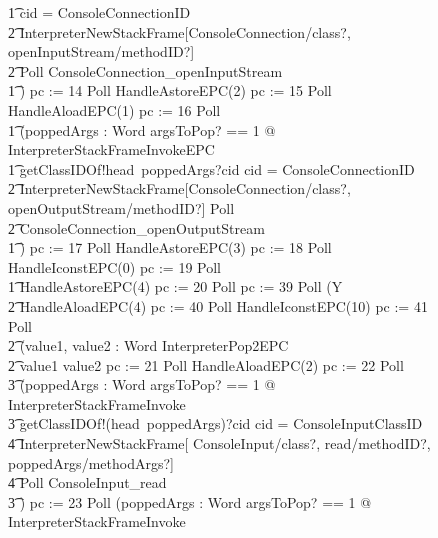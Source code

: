 \begin{figure}[tp!]
{\begin{circus}
    \t1 \circif cid = ConsoleConnectionID \circthen {} \\
    \t2 \lschexpract InterpreterNewStackFrame[ConsoleConnection/class?, openInputStream/methodID?] \rschexpract \circseq \\
    \t2 Poll \circseq ConsoleConnection\_openInputStream \\
    \t1 \circfi) \circseq pc := 14 \circseq Poll \circseq HandleAstoreEPC(2) \circseq pc := 15 \circseq Poll \circseq HandleAloadEPC(1) \circseq pc := 16 \circseq Poll \circseq \\
    \t1 (\circvar poppedArgs : Word \circspot \lschexpract \exists argsToPop? == 1 @ InterpreterStackFrameInvokeEPC \rschexpract \circseq \\
    \t1 getClassIDOf!head~poppedArgs?cid \then \circif cid = ConsoleConnectionID \circthen {} \\
    \t2 \lschexpract InterpreterNewStackFrame[ConsoleConnection/class?, openOutputStream/methodID?] \rschexpract \circseq Poll \circseq \\
    \t2 ConsoleConnection\_openOutputStream \\
    \t1 \circfi) \circseq pc := 17 \circseq Poll \circseq HandleAstoreEPC(3) \circseq pc := 18 \circseq Poll \circseq HandleIconstEPC(0) \circseq pc := 19 \circseq Poll \circseq \\
    \t1 HandleAstoreEPC(4) \circseq pc := 20 \circseq Poll \circseq pc := 39 \circseq Poll \circseq (\circmu Y \circspot \\
    \t2 HandleAloadEPC(4) \circseq pc := 40 \circseq Poll \circseq HandleIconstEPC(10) \circseq  pc := 41 \circseq Poll \circseq \\
    \t2 (\circvar value1, value2 : Word \circspot InterpreterPop2EPC \\
    \t2 \circif value1 \leq value2 \circthen pc := 21 \circseq Poll \circseq HandleAloadEPC(2) \circseq pc := 22 \circseq Poll \circseq \\
    \t3 (\circvar poppedArgs : \seq Word \circspot \lschexpract \exists argsToPop?  == 1 @ InterpreterStackFrameInvoke \rschexpract \circseq \\
    \t3 getClassIDOf!(head~poppedArgs)?cid \then \circif cid = ConsoleInputClassID \circthen {} \\
    \t4 \lschexpract InterpreterNewStackFrame[ ConsoleInput/class?, read/methodID?, poppedArgs/methodArgs?] \rschexpract \circseq \\
    \t4 Poll \circseq ConsoleInput\_read \\
    \t3 \circfi) \circseq pc := 23 \circseq Poll \circseq (\circvar poppedArgs : \seq Word \circspot \lschexpract \exists argsToPop? == 1 @ InterpreterStackFrameInvoke \rschexpract \circseq \\

\end{circus}}
\end{figure}
